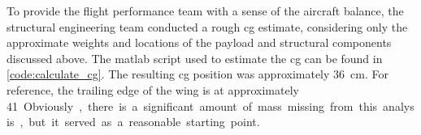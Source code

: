 To provide the flight performance team with a sense of the aircraft balance, the structural engineering team conducted a rough \acrshort{cg} estimate, considering only the approximate weights and locations of the payload and structural components discussed above. The \acrshort{matlab} script used to estimate the \acrshort{cg} can be found in \autoref{code:calculate_cg}. The resulting \acrshort{cg} position was approximately \qty{36}{\centi\meter}. For reference, the trailing edge of the wing is at approximately \qty{41}.

Obviously, there is a significant amount of mass missing from this analysis, but it served as a reasonable starting point.
